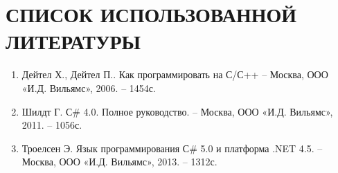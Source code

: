 \documentclass[14pt,a4paper]{extreport}
\begin{document}
	\newpage
	\section*{\center\normalsize СПИСОК ИСПОЛЬЗОВАННОЙ ЛИТЕРАТУРЫ \endcenter}
	\begin{enumerate}
	\item Дейтел Х., Дейтел П.. Как программировать на С/С++ – Москва, ООО «И.Д. Вильямс», 2006. – 1454с.
	\item Шилдт Г. С\# 4.0. Полное руководство. – Москва, ООО «И.Д. Вильямс», 2011. – 1056с.
	\item Троелсен Э. Язык программирования С\# 5.0 и платформа .NET 4.5. – Москва, ООО «И.Д. Вильямс», 2013. – 1312с.
	\end{enumerate}
\end{document}
